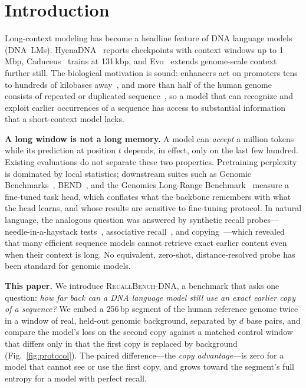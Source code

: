 
\section{Introduction}

Long-context modeling has become a headline feature of DNA language models (DNA~LMs).
HyenaDNA~\cite{nguyen2023hyenadna} reports checkpoints with context windows up to 1\,Mbp,
Caduceus~\cite{schiff2024caduceus} trains at 131\,kbp, and Evo~\cite{nguyen2024evo,brixi2025evo2}
extends genome-scale context further still. The biological motivation is sound: enhancers
act on promoters tens to hundreds of kilobases away~\cite{avsec2021enformer}, and more than
half of the human genome consists of repeated or duplicated
sequence~\cite{dekoning2011repeats}, so a model that can recognize and exploit earlier
occurrences of a sequence has access to substantial information that a short-context model
lacks.

\textbf{A long window is not a long memory.} A model can \emph{accept} a million tokens while
its prediction at position $t$ depends, in effect, only on the last few hundred. Existing
evaluations do not separate these two properties. Pretraining perplexity is dominated by
local statistics; downstream suites such as Genomic Benchmarks~\cite{gresova2023genomicbenchmarks},
BEND~\cite{marin2024bend}, and the Genomics Long-Range Benchmark~\cite{trop2024lrb} measure a
fine-tuned task head, which conflates what the backbone remembers with what the head learns,
and whose results are sensitive to fine-tuning protocol. In natural language, the analogous
question was answered by synthetic recall probes---needle-in-a-haystack
tests~\cite{kamradt2023needle,hsieh2024ruler}, associative recall~\cite{arora2024zoology},
and copying~\cite{jelassi2024repeat}---which revealed that many efficient sequence models
cannot retrieve exact earlier content even when their context is long. No equivalent,
zero-shot, distance-resolved probe has been standard for genomic models.

\textbf{This paper.} We introduce \textsc{RecallBench-DNA}, a benchmark that asks one
question: \emph{how far back can a DNA language model still use an exact earlier copy of a
sequence?} We embed a 256\,bp segment of the human reference genome twice in a window of
real, held-out genomic background, separated by $d$ base pairs, and compare the model's loss
on the second copy against a matched control window that differs only in that the first copy
is replaced by background (Fig.~\ref{fig:protocol}). The paired difference---the \emph{copy
advantage}---is zero for a model that cannot see or use the first copy, and grows toward the
segment's full entropy for a model with perfect recall.


